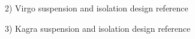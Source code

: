 2) Virgo suspension and isolation design reference

3) Kagra suspension and isolation design reference











